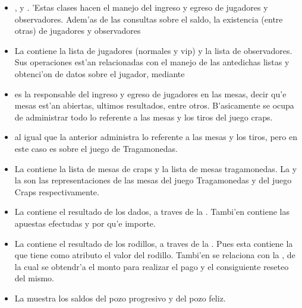 \begin{itemize}
 \item {},  y . 'Estas clases hacen el manejo del ingreso y egreso de jugadores y observadores. Adem'as de las consultas sobre el saldo, la existencia (entre otras) de jugadores y observadores

\item La  contiene la lista de jugadores (normales y vip) y la lista de observadores.
Sus operaciones est'an relacionadas con el manejo de las antedichas listas y obtenci'on de datos sobre el jugador, mediante 

\item {} es la responsable del ingreso y egreso de jugadores en las mesas, decir qu'e mesas est'an abiertas, ultimos resultados, entre otros. B'asicamente se ocupa de administrar todo lo referente a las mesas y los tiros del juego craps.

\item {} al igual que la anterior administra lo referente a las mesas y los tiros, pero en este caso es sobre el juego de Tragamonedas.

\item La  contiene la lista de mesas de craps y la lista de mesas tragamonedas. La  y la  son las representaciones de las mesas del juego Tragamonedas y del juego Craps respectivamente. 

\item La  contiene el resultado de los dados, a traves de la . Tambi'en contiene las apuestas efectudas y por qu'e importe.

\item La  contiene el resultado de los rodillos, a traves de la . Pues esta contiene la  que tiene como atributo el valor del rodillo.
Tambi'en se relaciona con la , de la cual se obtendr'a el monto para realizar el pago y el consiguiente reseteo del mismo.

\item La  muestra los saldos del pozo progresivo y del pozo feliz.


\end{itemize}
